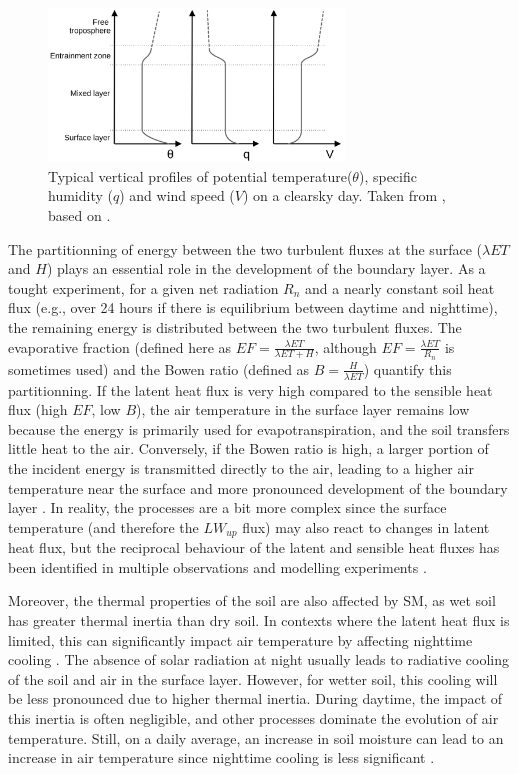 \begin{figure}[ht]
    \centering
    \includegraphics[width=0.7\textwidth]{images/intro/abl_lunel.png}
    \caption{Typical vertical profiles of potential temperature($\theta$), specific humidity ($q$) and wind speed ($V$) on a clearsky day. Taken from \citet{lunel_interactions_2024}, based on \citet{stull2012introduction}.}
    \label{fig:abl_structure}
\end{figure}

The partitionning of energy between the two turbulent fluxes at the surface ($\lambda ET$ and $H$) plays an essential role in the development of the boundary layer. As a tought experiment, for a given net radiation $R_n$ and a nearly constant soil heat flux (e.g., over 24 hours if there is equilibrium between daytime and nighttime), the remaining energy is distributed between the two turbulent fluxes. The evaporative fraction (defined here as $EF = \frac{\lambda ET}{\lambda ET+H}$, although $EF = \frac{\lambda ET}{R_n}$ is sometimes used) and the Bowen ratio (defined as $B = \frac{H}{\lambda ET}$) quantify this partitionning. If the latent heat flux is very high compared to the sensible heat flux (high $EF$, low $B$), the air temperature in the surface layer remains low because the energy is primarily used for evapotranspiration, and the soil transfers little heat to the air. Conversely, if the Bowen ratio is high, a larger portion of the incident energy is transmitted directly to the air, leading to a higher air temperature near the surface and more pronounced development of the boundary layer \citep{betts_fife_1995}.
In reality, the processes are a bit more complex since the surface temperature (and therefore the $LW_{up}$ flux) may also react to changes in latent heat flux, but the reciprocal behaviour of the latent and sensible heat fluxes has been identified in multiple observations and modelling experiments \citep{betts_fife_1995, seneviratne_investigating_2010}.

Moreover, the thermal properties of the soil are also affected by SM, as wet soil has greater thermal inertia than dry soil. In contexts where the latent heat flux is limited, this can significantly impact air temperature by affecting nighttime cooling \citep{ait-mesbah_role_2015}. The absence of solar radiation at night usually leads to radiative cooling of the soil and air in the surface layer. However, for wetter soil, this cooling will be less pronounced due to higher thermal inertia. During daytime, the impact of this inertia is often negligible, and other processes dominate the evolution of air temperature. Still, on a daily average, an increase in soil moisture can lead to an increase in air temperature since nighttime cooling is less significant \citep{cheruy_role_2017}.


